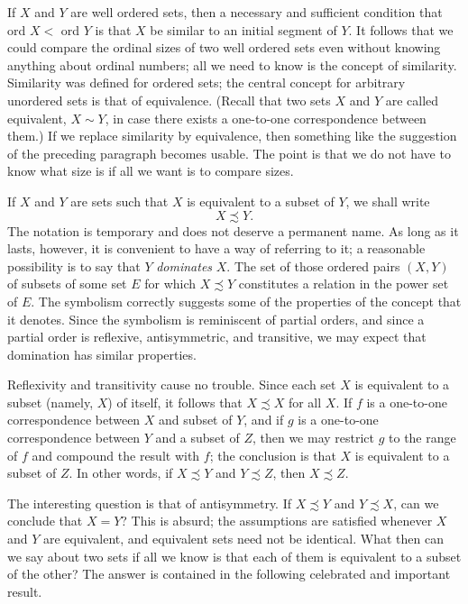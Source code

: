If $X$ and $Y$ are well ordered sets, then a necessary and sufficient condition that ord $X <$ ord $Y$ is that $X$ be similar to an initial segment of $Y$. It follows that we could compare the ordinal sizes of two well ordered sets even without knowing anything about ordinal numbers; all we need to know is the concept of similarity. Similarity was defined for ordered sets; the central concept for arbitrary unordered sets is that of equivalence. (Recall that two sets $X$ and $Y$ are called equivalent, $X \sim Y$, in case there exists a one-to-one correspondence between them.) If we replace similarity by equivalence, then something like the suggestion of the preceding paragraph becomes usable. The point is that we do not have to know what size is if all we want is to compare sizes. 

If $X$ and $Y$ are sets such that $X$ is equivalent to a subset of $Y$, we shall write 
\begin{equation*}
X \precsim Y. 
\end{equation*}
The notation is temporary and does not deserve a permanent name. As long as it lasts, however, it is convenient to have a way of referring to it; a reasonable possibility is to say that $Y$ \textit{dominates} $X$. The set of those ordered pairs $(X, Y)$ of subsets of some set $E$ for which $X \precsim Y$ constitutes a relation in the power set of $E$. The symbolism correctly suggests some of the properties of the concept that it denotes. Since the symbolism is reminiscent of partial orders, and since a partial order is reflexive, antisymmetric, and transitive, we may expect   that domination has similar properties. 

Reflexivity and transitivity cause no trouble. Since each set $X$ is equivalent to a subset (namely, $X$) of itself, it follows that $X \precsim X$ for all $X$. If $f$ is a one-to-one correspondence between $X$ and subset of $Y$, and if $g$ is a one-to-one correspondence between $Y$ and a subset of $Z$, then we may restrict $g$ to the range of $f$ and compound the result with $f$; the conclusion is that $X$ is equivalent to a subset of $Z$. In other words, if $X \precsim Y$ and  $Y \precsim Z$, then $X \precsim Z$. 

The interesting question is that of antisymmetry. If $X \precsim Y$ and $Y \precsim X$, can we conclude that $X = Y$? This is absurd; the assumptions are satisfied whenever $X$ and $Y$ are equivalent, and equivalent sets need not be identical. What then can we say about two sets if all we know is that each of them is equivalent to a subset of the other? The answer is contained in the following celebrated and important result. 

